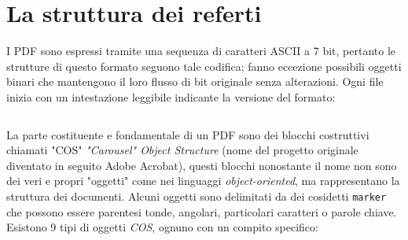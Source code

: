 \section{La struttura dei referti}
I PDF sono espressi tramite una sequenza di caratteri ASCII a 7 bit, pertanto le strutture di questo formato seguono tale codifica; fanno eccezione possibili oggetti binari che mantengono il loro flusso di bit originale senza alterazioni.
Ogni file inizia con un intestazione leggibile indicante la versione del formato:
\begin{center}
\begin{lstlisting}[language=C]
			%PDF-1.4	
\end{lstlisting}
\end{center}
La parte costituente e fondamentale di un PDF sono dei blocchi costruttivi chiamati "COS" \textit{"Carousel" Object Structure} (nome del progetto originale diventato in seguito Adobe Acrobat), questi blocchi nonostante il nome non sono dei veri e propri "oggetti" come nei linguaggi \textit{object-oriented}, ma rappresentano la struttura dei documenti.
Alcuni oggetti sono delimitati da dei cosidetti \texttt{marker} che possono essere parentesi tonde, angolari, particolari caratteri o parole chiave.
Esistono 9 tipi di oggetti \textit{COS}, ognuno con un compito specifico:
